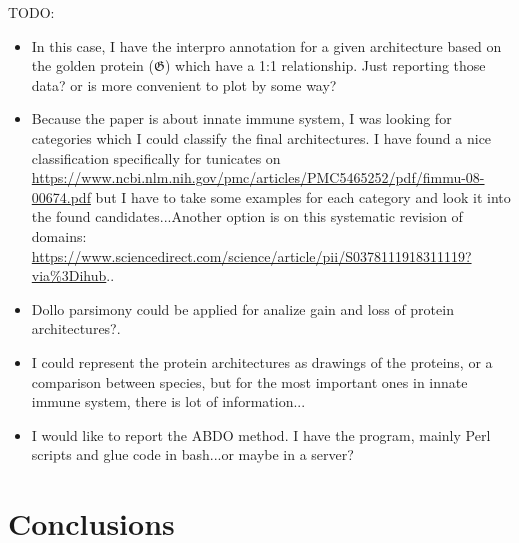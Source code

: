 \documentclass[11pt]{article}
\newcommand{\TODO}[1]{\begingroup\color{red}#1\endgroup}
\begin{document}
\TODO{TODO:}
\begin{itemize}
\item \TODO{In this case, I have the interpro annotation for a given architecture based
on the golden protein ($\boldsymbol{\mathfrak{G}}$) which have a 1:1 relationship. Just
reporting those data? or is more convenient to plot by some way?}
\item \TODO{Because the paper is about innate immune system, I was looking for 
categories which I could classify the final architectures. I have found a nice classification
specifically for tunicates on \url{https://www.ncbi.nlm.nih.gov/pmc/articles/PMC5465252/pdf/fimmu-08-00674.pdf} but I have to take some examples for each category and look it into
the found candidates...Another option is on this systematic revision of domains: \url{https://www.sciencedirect.com/science/article/pii/S0378111918311119?via\%3Dihub}.}.
\item \TODO{Dollo parsimony could be applied for analize gain and loss of protein architectures?.}
\item \TODO{I could represent the protein architectures as drawings of the proteins, or a comparison between species, but for the most important ones in innate immune system, there is lot of information...}
\item \TODO{I would like to report the ABDO method. I have the program, mainly Perl scripts and glue code in bash...or maybe in a server?}
\end{itemize}

\section*{Conclusions}



\end{document}
